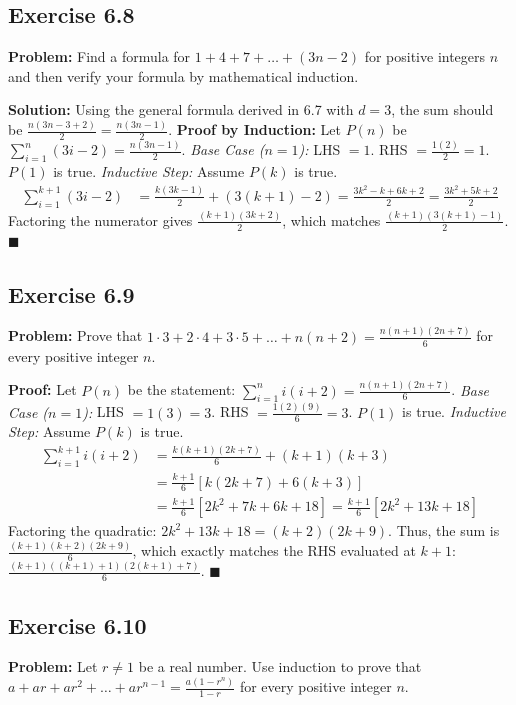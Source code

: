 \documentclass[11pt, a4paper]{article}
\theoremstyle{definition}
\theoremstyle{remark}
\begin{document}
\subsection*{Exercise 6.8}
\textbf{Problem:} Find a formula for $1 + 4 + 7 + \dots + (3n - 2)$ for positive integers $n$ and then verify your formula by mathematical induction.

\textbf{Solution:}
Using the general formula derived in 6.7 with $d=3$, the sum should be $\frac{n(3n - 3 + 2)}{2} = \frac{n(3n - 1)}{2}$.
\textbf{Proof by Induction:}
Let $P(n)$ be $\sum_{i=1}^n (3i - 2) = \frac{n(3n - 1)}{2}$.
\textit{Base Case ($n=1$):} LHS $= 1$. RHS $= \frac{1(2)}{2} = 1$. $P(1)$ is true.
\textit{Inductive Step:} Assume $P(k)$ is true.
\[
\begin{aligned}
\sum_{i=1}^{k+1} (3i - 2) &= \frac{k(3k - 1)}{2} + (3(k+1) - 2) = \frac{3k^2 - k + 6k + 2}{2} = \frac{3k^2 + 5k + 2}{2}
\end{aligned}
\]
Factoring the numerator gives $\frac{(k+1)(3k+2)}{2}$, which matches $\frac{(k+1)(3(k+1)-1)}{2}$. \hfill $\blacksquare$

\subsection*{Exercise 6.9}
\textbf{Problem:} Prove that $1 \cdot 3 + 2 \cdot 4 + 3 \cdot 5 + \dots + n(n+2) = \frac{n(n+1)(2n+7)}{6}$ for every positive integer $n$.

\textbf{Proof:}
Let $P(n)$ be the statement: $\sum_{i=1}^n i(i+2) = \frac{n(n+1)(2n+7)}{6}$.
\textit{Base Case ($n=1$):} LHS $= 1(3) = 3$. RHS $= \frac{1(2)(9)}{6} = 3$. $P(1)$ is true.
\textit{Inductive Step:} Assume $P(k)$ is true.
\[
\begin{aligned}
\sum_{i=1}^{k+1} i(i+2) &= \frac{k(k+1)(2k+7)}{6} + (k+1)(k+3) \\
&= \frac{k+1}{6} \left[ k(2k+7) + 6(k+3) \right] \\
&= \frac{k+1}{6} \left[ 2k^2 + 7k + 6k + 18 \right] = \frac{k+1}{6} \left[ 2k^2 + 13k + 18 \right]
\end{aligned}
\]
Factoring the quadratic: $2k^2 + 13k + 18 = (k+2)(2k+9)$.
Thus, the sum is $\frac{(k+1)(k+2)(2k+9)}{6}$, which exactly matches the RHS evaluated at $k+1$: $\frac{(k+1)((k+1)+1)(2(k+1)+7)}{6}$. \hfill $\blacksquare$

\subsection*{Exercise 6.10}
\textbf{Problem:} Let $r \neq 1$ be a real number. Use induction to prove that $a + ar + ar^2 + \dots + ar^{n-1} = \frac{a(1-r^n)}{1-r}$ for every positive integer $n$.
\end{document}
